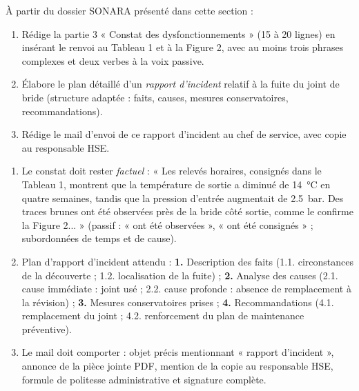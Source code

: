 \documentclass[11pt]{article}
\begin{document}
\begin{exercice}
À partir du dossier SONARA présenté dans cette section :
\begin{enumerate}
\item Rédige la partie 3 « Constat des dysfonctionnements » (15 à 20 lignes) en insérant le renvoi au Tableau 1 et à la Figure 2, avec au moins trois phrases complexes et deux verbes à la voix passive.
\item Élabore le plan détaillé d'un \emph{rapport d'incident} relatif à la fuite du joint de bride (structure adaptée : faits, causes, mesures conservatoires, recommandations).
\item Rédige le mail d'envoi de ce rapport d'incident au chef de service, avec copie au responsable HSE.
\end{enumerate}
\end{exercice}

\begin{corrige}
\begin{enumerate}
\item Le constat doit rester \emph{factuel} : « Les relevés horaires, consignés dans le Tableau 1, montrent que la température de sortie a diminué de \SI{14}{\celsius} en quatre semaines, tandis que la pression d'entrée augmentait de \SI{2,5}{bar}. Des traces brunes ont été observées près de la bride côté sortie, comme le confirme la Figure 2... » (passif : « ont été observées », « ont été consignés » ; subordonnées de temps et de cause).
\item Plan d'rapport d'incident attendu : \textbf{1.} Description des faits (1.1. circonstances de la découverte ; 1.2. localisation de la fuite) ; \textbf{2.} Analyse des causes (2.1. cause immédiate : joint usé ; 2.2. cause profonde : absence de remplacement à la révision) ; \textbf{3.} Mesures conservatoires prises ; \textbf{4.} Recommandations (4.1. remplacement du joint ; 4.2. renforcement du plan de maintenance préventive).
\item Le mail doit comporter : objet précis mentionnant « rapport d'incident », annonce de la pièce jointe PDF, mention de la copie au responsable HSE, formule de politesse administrative et signature complète.
\end{enumerate}
\end{corrige}
\end{document}
